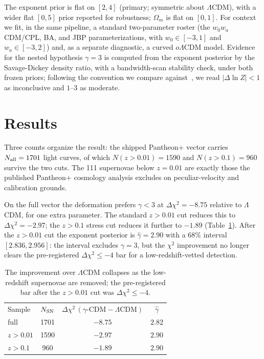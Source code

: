 \documentclass[
  aps,
  prd,
  reprint,           %
  nofootinbib,
  longbibliography
]{revtex4-2}
\begin{document}
The exponent prior is flat on $[2,4]$ (primary; symmetric about
$\Lambda$CDM), with a wider flat $[0,5]$ prior reported for robustness;
$\Omega_m$ is flat on $[0,1]$. For context we fit, in the same pipeline, a
standard two-parameter roster (the $w_0 w_a$CDM/CPL, BA, and JBP
parameterizations, with $w_0 \in [-3,1]$ and $w_a \in [-3,2]$) and, as a
separate diagnostic, a curved $o\Lambda$CDM model. Evidence for the nested
hypothesis $\gamma = 3$ is computed from the exponent posterior by the
Savage-Dickey density ratio, with a bandwidth-scan stability check, under
both frozen priors; following the convention we compare
against~\cite{Chaud}, we read $|\Delta\ln Z| < 1$ as inconclusive and
$1$--$3$ as moderate.

\section{Results}\label{sec:results}

Three counts organize the result: the shipped Pantheon+ vector carries
$N_{\rm all} = 1701$ light curves, of which $N(z>0.01) = 1590$ and
$N(z>0.1) = 960$ survive the two cuts. The 111 supernovae below
$z = 0.01$ are exactly those the published Pantheon+ cosmology analysis
excludes on peculiar-velocity and calibration grounds.

On the full vector the deformation prefers $\gamma < 3$ at
$\Delta\chi^2 = -8.75$ relative to $\Lambda$CDM, for one extra parameter.
The standard $z > 0.01$ cut reduces this to $\Delta\chi^2 = -2.97$; the
$z > 0.1$ stress cut reduces it further to $-1.89$
(Table~\ref{tab:collapse}). After the $z > 0.01$ cut the exponent
posterior is $\hat\gamma = 2.90$ with a $68\%$ interval $[2.836, 2.956]$:
the interval excludes $\gamma = 3$, but the $\chi^2$ improvement no longer
clears the pre-registered $\Delta\chi^2 \le -4$ bar for a
low-redshift-vetted detection.

\begin{table}[t]
\caption{The improvement over $\Lambda$CDM collapses as the low-redshift
supernovae are removed; the pre-registered bar after the $z>0.01$ cut was
$\Delta\chi^2 \le -4$.}
\label{tab:collapse}
\begin{ruledtabular}
\begin{tabular}{lccc}
Sample & $N_{\rm SN}$ & $\Delta\chi^2\,(\gamma\text{-CDM}-\Lambda\text{CDM})$ & $\hat\gamma$ \\
\colrule
full        & 1701 & $-8.75$ & $2.82$ \\
$z > 0.01$  & 1590 & $-2.97$ & $2.90$ \\
$z > 0.1$   & \phantom{0}960  & $-1.89$ & $2.90$ \\
\end{tabular}
\end{ruledtabular}
\end{table}
\end{document}
